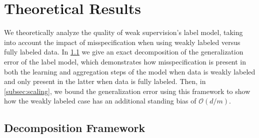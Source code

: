 \section{Theoretical Results} \label{sec:theory}

We theoretically analyze the quality of weak supervision's label model, taking into account the impact of misspecification when using weakly labeled versus fully labeled data. %
In \ref{subsec:decomp} we give 
an exact decomposition of the generalization error of the label model, which demonstrates how misspecification is present in both the learning and aggregation steps of the model when data is weakly labeled and only present in the latter when data is fully labeled. Then, in \ref{subsec:scaling}, we bound the generalization error using this framework to show how the weakly labeled case has an additional standing bias of $\mathcal{O}(d/m)$.




\subsection{Decomposition Framework}
\label{subsec:decomp}%


